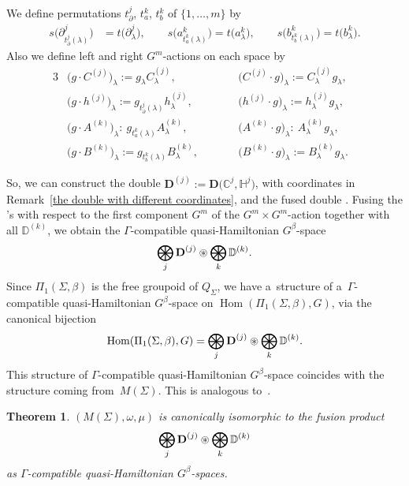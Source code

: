 \documentclass[pdftex]{sigma}
\numberwithin{equation}{section}
\newtheorem{Theorem}{Theorem}[section]
\theoremstyle{definition}
\newcommand{\Hom}{\operatorname{Hom}}
\newcommand{\bH}{\mathbb{H}}
\newcommand{\bD}{\mathbb{D}}
\newcommand{\bC}{\mathbb{C}}
\newcommand{\bA}{\mathbb{A}}
\newcommand{\bB}{\mathbb{B}}
\DeclareMathOperator*{\bigfusion}{\text{\rlap{$\bigoplus$}$\bigotimes$}}
\begin{document}
We define permutations $t^{j}_{\partial}$, $t^{k}_{a}$, $t^{k}_{b}$ of $\{1,\dots,m\}$ by
\begin{align*}
 s\bigl(\partial^{j}_{t^{j}_{\partial}(\lambda)}\bigr) &= t\bigl(\partial^{j}_{\lambda}\bigr), \qquad
 s\bigl(a^{k}_{t^{k}_{a}(\lambda)}\bigr) = t\bigl(a^{k}_{\lambda}\bigr), \qquad
 s\bigl(b^{k}_{t^{k}_{b}(\lambda)}\bigr) = t\bigl(b^{k}_{\lambda}\bigr).
\end{align*}
Also we define left and right $G^{m}$-actions on each space by
\begin{alignat*}{3}
& \bigl(g \cdot C^{(j)}\bigr)_{\lambda} := g_{\lambda}C^{(j)}_{\lambda},\qquad&& \bigl(C^{(j)} \cdot g\bigr)_{\lambda} := C^{(j)}_{\lambda}g_{\lambda},& \\
& \bigl(g \cdot h^{(j)}\bigr)_{\lambda} := g_{t^{j}_{\partial}(\lambda)}h^{(j)}_{\lambda},\qquad&& \bigl(h^{(j)}\cdot g\bigr)_{\lambda} := h^{(j)}_{\lambda} g_{\lambda}, &\\
& \bigl(g \cdot A^{(k)}\bigr)_{\lambda} \colon\ g_{t^{k}_{a}(\lambda)}A^{(k)}_{\lambda},\qquad &&\bigl(A^{(k)}\cdot g\bigr)_{\lambda} \colon\ A^{(k)}_{\lambda} g_{\lambda},&\\
& \bigl(g \cdot B^{(k)}\bigr)_{\lambda} := g_{t^{k}_{b}(\lambda)}B^{(k)}_{\lambda},\qquad&& \bigl(B^{(k)}\cdot g\bigr)_{\lambda} := B^{(k)}_{\lambda} g_{\lambda}.&
\end{alignat*}

So, we can construct the double $\textbf{D}^{(j)} := \textbf{D}\bigl(\bC^j,\bH^j\bigr)$, with coordinates in Remark~\ref{the double with different coordinates}, and the fused double \smash{$\bD^{(k)} := \bD\bigl(\bA^k,\bB^k\bigr)$}.
Fusing the 's with respect to the first component $G^m$ of the $G^m \times G^m$-action together with all $\bD^{(k)}$, we obtain the $\Gamma$-compatible quasi-Hamiltonian $G^{\beta}$-space
\[
\bigfusion_{j} \textbf{D}^{(j)} \circledast \bigfusion_{k} \bD^{(k)}.
\]
Since $\Pi_1(\Sigma,\beta)$ is the free groupoid of $Q_{\Sigma}$, we have a~structure of a~$\Gamma$-compatible quasi-Hamiltoni\-an $G^{\beta}$-space on $\Hom(\Pi_1(\Sigma,\beta),G)$, via the canonical bijection
\[
\Hom(\Pi_1(\Sigma,\beta),G) = \bigfusion_{j} \textbf{D}^{(j)} \circledast \bigfusion_{k} \bD^{(k)}.
\]
This structure of $\Gamma$-compatible quasi-Hamiltonian $G^{\beta}$-space coincides with the structure coming from~$M(\Sigma)$.
This is analogous to~\cite[Theorem 9.3]{AMM}.

\begin{Theorem}
 $(M(\Sigma),\omega,\mu)$ is canonically isomorphic to the fusion product
 \[ \bigfusion_{j} \textbf{D}^{(j)} \circledast \bigfusion_{k} \bD^{(k)}\]
 as $\Gamma$-compatible quasi-Hamiltonian $G^{\beta}$-spaces.
\end{Theorem}
\end{document}
